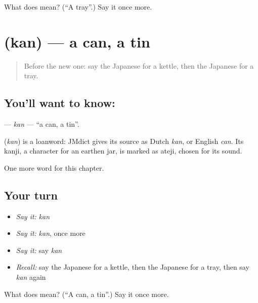 \begin{tcolorbox}[breakable,colback=teal!4,colframe=teal!35!black,title={Before you move on}]
What does  mean? (\textquotedblleft{}A tray\textquotedblright{}.) Say it once more.
\end{tcolorbox}
\section[\texorpdfstring{\ja{かん} (kan)}{かん (kan)}]{ (kan) — a can, a tin}

\label{lesson:JA-C103-kan}



\begin{quote}
Before the new one: say the Japanese for a kettle, then the Japanese for a tray.
\end{quote}

\subsection*{You'll want to know: }
\textbf{} — \emph{kan} — \textquotedblleft{}a can, a tin\textquotedblright{}.

\begin{cousinweb}
\textbf{} (\emph{kan}) is a loanword: JMdict gives its source as Dutch \emph{kan}, or English \emph{can}. Its kanji, a character for an earthen jar, is marked as ateji, chosen for its sound.
\end{cousinweb}

\begin{grammarlens}[title={What you've built}]
One more word for this chapter.
\end{grammarlens}

\subsection*{Your turn}
\begin{itemize}
\raggedright
  \item \emph{Say it:} \emph{kan}
  \item \emph{Say it:} \emph{kan}, once more
  \item \emph{Say it:} say \emph{kan}
  \item \emph{Recall:} say the Japanese for a kettle, then the Japanese for a tray, then say \emph{kan} again
\end{itemize}

\begin{tcolorbox}[breakable,colback=teal!4,colframe=teal!35!black,title={Before you move on}]
What does  mean? (\textquotedblleft{}A can, a tin\textquotedblright{}.) Say it once more.
\end{tcolorbox}
